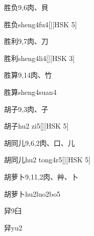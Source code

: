 \begin{entry}{胜负}{9,6}{⾁、⾙}
  \begin{phonetics}{胜负}{sheng4fu4}[][HSK 5]
  \end{phonetics}
\end{entry}

\begin{entry}{胜利}{9,7}{⾁、⼑}
  \begin{phonetics}{胜利}{sheng4li4}[][HSK 3]
  \end{phonetics}
\end{entry}

\begin{entry}{胜算}{9,14}{⾁、⽵}
  \begin{phonetics}{胜算}{sheng4suan4}
  \end{phonetics}
\end{entry}

\begin{entry}{胡子}{9,3}{⾁、⼦}
  \begin{phonetics}{胡子}{hu2 zi5}[][HSK 5]
  \end{phonetics}
\end{entry}

\begin{entry}{胡同儿}{9,6,2}{⾁、⼝、⼉}
  \begin{phonetics}{胡同儿}{hu2 tong4r5}[][HSK 5]
  \end{phonetics}
\end{entry}

\begin{entry}{胡萝卜}{9,11,2}{⾁、⾋、⼘}
  \begin{phonetics}{胡萝卜}{hu2luo2bo5}
  \end{phonetics}
\end{entry}

\begin{entry}{舁}{9}{⾅}
  \begin{phonetics}{舁}{yu2}
  \end{phonetics}
\end{entry}

